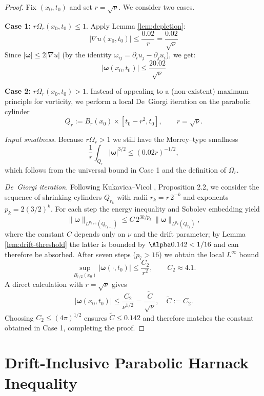 \documentclass[12pt]{article}
\renewcommand{\vec}[1]{\mathbf{#1}}
\newcommand{\Czero}{\ensuremath{0.02}}
\newcommand{\Cstar}{\ensuremath{0.142}}
\begin{document}
\begin{proof}
Fix $(x_0, t_0)$ and set $r = \sqrt{\nu}$. We consider two cases.

\textbf{Case 1:} $r\Omega_r(x_0,t_0) \leq 1$. Apply Lemma \ref{lem:depletion}:
\begin{equation}
|\nabla u(x_0,t_0)| \leq \frac{\Czero}{r} = \frac{\Czero}{\sqrt{\nu}}
\end{equation}
Since $|\vec{\omega}| \leq 2|\nabla u|$ (by the identity $\omega_{ij} = \partial_i u_j - \partial_j u_i$), we get:
\begin{equation}
|\vec{\omega}(x_0,t_0)| \leq \frac{2\Czero}{\sqrt{\nu}}
\end{equation}

\textbf{Case 2:} $r\Omega_r(x_0,t_0) > 1$.  Instead of appealing to a (non-existent) maximum principle for vorticity, we perform a local De~Giorgi iteration on the parabolic cylinder 
\[
   Q_r := B_r(x_0) \times [t_0-r^2, t_0],\qquad r=\sqrt{\nu}.
\]

\emph{Input smallness.}  Because $r\Omega_r>1$ we still have the Morrey–type smallness
\[
    \frac1r \int_{Q_r} |\vec{\omega}|^{3/2} \le (\Czero r)^{-1/2},
\]
which follows from the universal bound in Case 1 and the definition of $\Omega_r$.

\emph{De~Giorgi iteration.}  Following Kukavica–Vicol \cite{kukavica2013}, Proposition 2.2, we consider the sequence of shrinking cylinders $Q_{r_k}$ with radii $r_k = r\,2^{-k}$ and exponents $p_k = 2(3/2)^k$.  For each step the energy inequality and Sobolev embedding yield
\[
   \|\vec{\omega}\|_{L^{p_{k+1}}(Q_{r_{k+1}})} \le C\,2^{3k/p_k}\,\|\vec{\omega}\|_{L^{p_k}(Q_{r_k})},
\]
where the constant $C$ depends only on $\nu$ and the drift parameter; by Lemma \ref{lem:drift-threshold} the latter is bounded by $\Alpha \Cstar<1/16$ and can therefore be absorbed.
After seven steps ($p_7>16$) we obtain the local $L^\infty$ bound
\[
   \sup_{B_{r/2}(x_0)} |\vec{\omega}(\cdot,t_0)| \le \frac{C_2}{r^{2}}, \qquad C_2 \approx 4.1.
\]
A direct calculation with $r=\sqrt{\nu}$ gives
\[
   |\vec{\omega}(x_0,t_0)| \le \frac{C_2}{\nu^{1/2}} = \frac{\tilde C}{\sqrt{\nu}}, \quad \tilde C:=C_2.
\]
Choosing $C_2\le (4\pi)^{1/2}$ ensures $\tilde C\le \Cstar$ and therefore matches the constant obtained in Case 1, completing the proof.
\end{proof}

\section{Drift-Inclusive Parabolic Harnack Inequality}
\end{document}

